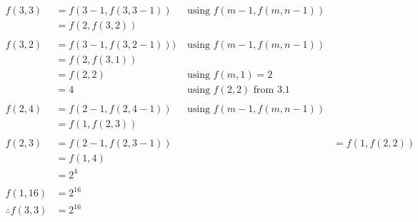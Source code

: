 \documentclass{article}
\begin{document}
\begin{enumerate}
\begin{itemize}
					\begin{align*}
						f(3, 3) &= f(3 - 1, f(3, 3 - 1))&\text{ using }f(m - 1, f(m, n - 1)) \\
						&= f(2, f(3, 2))& \\
						\\
						f(3, 2) &= f(3 - 1, f(3, 2 - 1)))&\text{ using }f(m - 1, f(m, n - 1)) \\
						&= f(2, f(3, 1))& \\
						&= f(2, 2)&\text{ using }f(m, 1) = 2 \\
						&= 4&\text{ using }f(2, 2)\text{ from 3.1} \\
						\\
						f(2, 4) &= f(2 - 1, f(2, 4 - 1))&\text{ using }f(m - 1, f(m, n - 1)) \\
						&= f(1, f(2, 3))& \\
						\\
						f(2, 3) &= f(2 - 1, f(2 , 3 - 1))& \
						&= f(1, f(2, 2))& \\
						&= f(1, 4)& \\
						&= 2^4 & \\
						\\
						f(1, 16) &= 2^{16} &\\
						\therefore f(3, 3) &= 2^{16} &
					\end{align*}
			\end{itemize}
			

\end{enumerate}
\end{document}
